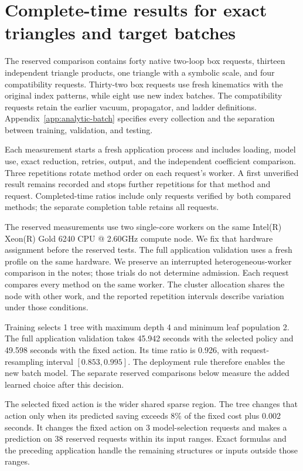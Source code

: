 \section{Complete-time results for exact triangles and target batches}
\label{sec:analytic-batch-results}
The reserved comparison contains forty native two-loop box requests, thirteen independent triangle products, one triangle with a symbolic scale, and four compatibility requests. Thirty-two box requests use fresh kinematics with the original index patterns, while eight use new index batches. The compatibility requests retain the earlier vacuum, propagator, and ladder definitions. Appendix~\ref{app:analytic-batch} specifies every collection and the separation between training, validation, and testing.

Each measurement starts a fresh application process and includes loading, model use, exact reduction, retries, output, and the independent coefficient comparison. Three repetitions rotate method order on each request's worker. A first unverified result remains recorded and stops further repetitions for that method and request. Completed-time ratios include only requests verified by both compared methods; the separate completion table retains all requests.

The reserved measurements use two single-core workers on the same Intel(R) Xeon(R) Gold 6240 CPU @ 2.60GHz compute node. We fix that hardware assignment before the reserved tests. The full application validation uses a fresh profile on the same hardware. We preserve an interrupted heterogeneous-worker comparison in the notes; those trials do not determine admission. Each request compares every method on the same worker. The cluster allocation shares the node with other work, and the reported repetition intervals describe variation under those conditions.

Training selects 1 tree with maximum depth 4 and minimum leaf population 2. The full application validation takes 45.942 seconds with the selected policy and 49.598 seconds with the fixed action. Its time ratio is 0.926, with request-resampling interval $[0.853,0.995]$. The deployment rule therefore enables the new batch model. The separate reserved comparisons below measure the added learned choice after this decision.

The selected fixed action is the wider shared sparse region. The tree changes that action only when its predicted saving exceeds 8\% of the fixed cost plus 0.002 seconds. It changes the fixed action on 3 model-selection requests and makes a prediction on 38 reserved requests within its input ranges. Exact formulas and the preceding application handle the remaining structures or inputs outside those ranges.

